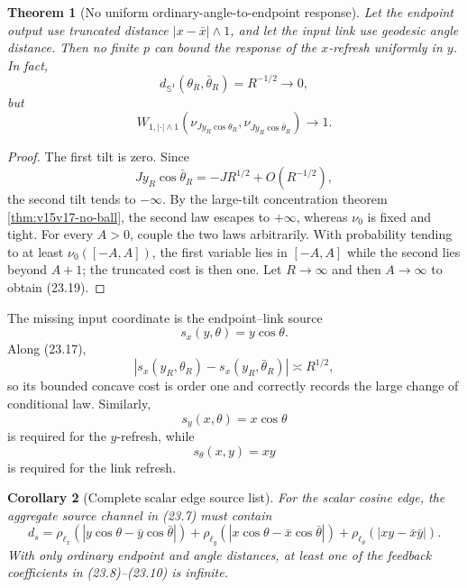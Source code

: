 \documentclass[11pt]{article}
\newtheorem{theorem}{Theorem}[section]
\newtheorem{corollary}[theorem]{Corollary}
\theoremstyle{remark}
\begin{document}
\begin{theorem}[No uniform ordinary-angle-to-endpoint response]
\label{thm:v15v23-no-angle}
Let the endpoint output use truncated distance
\(|x-\bar x|\wedge1\), and let the input link use geodesic angle
distance.  Then no finite \(p\) can bound the response of the
\(x\)-refresh uniformly in \(y\).  In fact,
\[
 d_{\mathbb S^1}(\theta_R,\bar\theta_R)=R^{-1/2}\to0,        \tag{23.18}
\]
but
\[
 W_{1,|\cdot|\wedge1}
 \left(
 \nu_{Jy_R\cos\theta_R},
 \nu_{Jy_R\cos\bar\theta_R}
 \right)\longrightarrow1.                                 \tag{23.19}
\]
\end{theorem}

\begin{proof}
The first tilt is zero.  Since
\[
 Jy_R\cos\bar\theta_R
 =
 -J R^{1/2}+O(R^{-1/2}),                                   \tag{23.20}
\]
the second tilt tends to \(-\infty\).  By the large-tilt
concentration theorem \ref{thm:v15v17-no-ball}, the second law
escapes to \(+\infty\), whereas \(\nu_0\) is fixed and tight.
For every \(A>0\), couple the two laws arbitrarily.  With
probability tending to at least \(\nu_0([-A,A])\), the first
variable lies in \([-A,A]\) while the second lies beyond \(A+1\);
the truncated cost is then one.  Let \(R\to\infty\) and then
\(A\to\infty\) to obtain (23.19).
\end{proof}

The missing input coordinate is the endpoint--link source
\[
 s_x(y,\theta)=y\cos\theta.                                \tag{23.21}
\]
Along (23.17),
\[
 |s_x(y_R,\theta_R)-s_x(y_R,\bar\theta_R)|
 \asymp R^{1/2},                                           \tag{23.22}
\]
so its bounded concave cost is order one and correctly records the
large change of conditional law.  Similarly,
\[
 s_y(x,\theta)=x\cos\theta                                 \tag{23.23}
\]
is required for the \(y\)-refresh, while
\[
 s_\theta(x,y)=xy                                          \tag{23.24}
\]
is required for the link refresh.

\begin{corollary}[Complete scalar edge source list]
\label{cor:v15v23-source-list}
For the scalar cosine edge, the aggregate source channel in
(23.7) must contain
\[
\boxed{
 d_s=
 \rho_{\ell_x}(|y\cos\theta-\bar y\cos\bar\theta|)
 +\rho_{\ell_y}(|x\cos\theta-\bar x\cos\bar\theta|)
 +\rho_{\ell_\theta}(|xy-\bar x\bar y|).}                  \tag{23.25}
\]
With only ordinary endpoint and angle distances, at least one of
the feedback coefficients in (23.8)--(23.10) is infinite.
\end{corollary}
\end{document}
